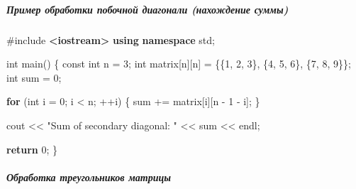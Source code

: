 \documentclass[
]{article}
\newenvironment{Shaded}{}{}
\newcommand{\AttributeTok}[1]{\textcolor[rgb]{0.49,0.56,0.16}{#1}}
\newcommand{\ControlFlowTok}[1]{\textcolor[rgb]{0.00,0.44,0.13}{\textbf{#1}}}
\newcommand{\DataTypeTok}[1]{\textcolor[rgb]{0.56,0.13,0.00}{#1}}
\newcommand{\DecValTok}[1]{\textcolor[rgb]{0.25,0.63,0.44}{#1}}
\newcommand{\ImportTok}[1]{\textcolor[rgb]{0.00,0.50,0.00}{\textbf{#1}}}
\newcommand{\KeywordTok}[1]{\textcolor[rgb]{0.00,0.44,0.13}{\textbf{#1}}}
\newcommand{\NormalTok}[1]{#1}
\newcommand{\OperatorTok}[1]{\textcolor[rgb]{0.40,0.40,0.40}{#1}}
\newcommand{\PreprocessorTok}[1]{\textcolor[rgb]{0.74,0.48,0.00}{#1}}
\newcommand{\StringTok}[1]{\textcolor[rgb]{0.25,0.44,0.63}{#1}}
\begin{document}
\subparagraph{Пример обработки побочной диагонали (нахождение
суммы)}\label{ux43fux440ux438ux43cux435ux440-ux43eux431ux440ux430ux431ux43eux442ux43aux438-ux43fux43eux431ux43eux447ux43dux43eux439-ux434ux438ux430ux433ux43eux43dux430ux43bux438-ux43dux430ux445ux43eux436ux434ux435ux43dux438ux435-ux441ux443ux43cux43cux44b}

\begin{Shaded}
\begin{Highlighting}[]
\PreprocessorTok{\#include }\ImportTok{\textless{}iostream\textgreater{}}
\KeywordTok{using} \KeywordTok{namespace}\NormalTok{ std}\OperatorTok{;}

\DataTypeTok{int}\NormalTok{ main}\OperatorTok{()} \OperatorTok{\{}
    \AttributeTok{const} \DataTypeTok{int}\NormalTok{ n }\OperatorTok{=} \DecValTok{3}\OperatorTok{;}
    \DataTypeTok{int}\NormalTok{ matrix}\OperatorTok{[}\NormalTok{n}\OperatorTok{][}\NormalTok{n}\OperatorTok{]} \OperatorTok{=} \OperatorTok{\{\{}\DecValTok{1}\OperatorTok{,} \DecValTok{2}\OperatorTok{,} \DecValTok{3}\OperatorTok{\},}
                        \OperatorTok{\{}\DecValTok{4}\OperatorTok{,} \DecValTok{5}\OperatorTok{,} \DecValTok{6}\OperatorTok{\},}
                        \OperatorTok{\{}\DecValTok{7}\OperatorTok{,} \DecValTok{8}\OperatorTok{,} \DecValTok{9}\OperatorTok{\}\};}
    \DataTypeTok{int}\NormalTok{ sum }\OperatorTok{=} \DecValTok{0}\OperatorTok{;}

    \ControlFlowTok{for} \OperatorTok{(}\DataTypeTok{int}\NormalTok{ i }\OperatorTok{=} \DecValTok{0}\OperatorTok{;}\NormalTok{ i }\OperatorTok{\textless{}}\NormalTok{ n}\OperatorTok{;} \OperatorTok{++}\NormalTok{i}\OperatorTok{)} \OperatorTok{\{}
\NormalTok{        sum }\OperatorTok{+=}\NormalTok{ matrix}\OperatorTok{[}\NormalTok{i}\OperatorTok{][}\NormalTok{n }\OperatorTok{{-}} \DecValTok{1} \OperatorTok{{-}}\NormalTok{ i}\OperatorTok{];}
    \OperatorTok{\}}

\NormalTok{    cout }\OperatorTok{\textless{}\textless{}} \StringTok{"Sum of secondary diagonal: "} \OperatorTok{\textless{}\textless{}}\NormalTok{ sum }\OperatorTok{\textless{}\textless{}}\NormalTok{ endl}\OperatorTok{;}

    \ControlFlowTok{return} \DecValTok{0}\OperatorTok{;}
\OperatorTok{\}}
\end{Highlighting}
\end{Shaded}

\subparagraph{Обработка треугольников
матрицы}\label{ux43eux431ux440ux430ux431ux43eux442ux43aux430-ux442ux440ux435ux443ux433ux43eux43bux44cux43dux438ux43aux43eux432-ux43cux430ux442ux440ux438ux446ux44b}
\end{document}
